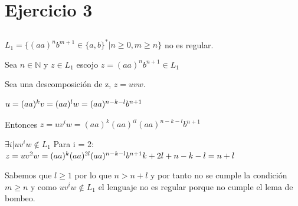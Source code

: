 \documentclass[12pt, spanish]{article}
\begin{document}
\section{Ejercicio 3}
\subsection{}
\begin{math}
L_{1} = \{ (aa)^{n}b^{m+1} \in \{a,b\}^{*} | n \geq 0, m\geq n \}
\end{math} no es regular.

Sea \begin{math} n \in \mathbb{N} \end{math} y \begin{math} z \in L_{1} \end{math} escojo \begin{math} z = (aa)^{n}b^{n+1} \in L_{1} \end{math}

Sea una descomposición de z, \begin{math} z = uvw \end{math}.

\begin{math}
u = (aa)^{k}\\
v = (aa)^{l}\\
w = (aa)^{n-k-l}b^{n+1}\\
\end{math}

Entonces \begin{math}
z = uv^{i}w = (aa)^{k}(aa)^{il}(aa)^{n-k-l}b^{n+1}
\end{math}

\begin{math}
\exists i | uv^{i}w \notin L_{1}
\end{math}
Para i = 2:\\
\begin{math}
z = uv^{2}w = (aa)^{k}(aa)^{2l}(aa)^{n-k-l}b^{n+1}\\
k+2l+n-k-l = n+l
\end{math}

Sabemos que \begin{math} l \geq 1 \end{math} por lo que \begin{math} n > n + l\end{math} y por tanto no se cumple la condición \begin{math} m\geq n \end{math} y como \begin{math}uv^{i}w \notin L_{1}\end{math} el lenguaje no es regular porque no cumple el lema de bombeo.
\end{document}
